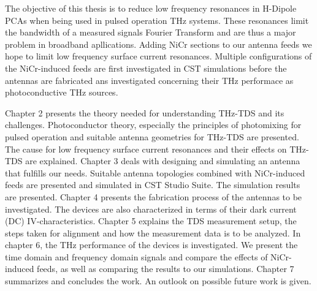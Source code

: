 The objective of this thesis is to reduce low frequency resonances in H-Dipole PCAs when being used in pulsed operation THz systems. These resonances limit the bandwidth of a measured signals Fourier Transform and are thus a major problem in broadband apllications. Adding NiCr sections to our antenna feeds we hope to limit low frequency surface current resonances. Multiple configurations of the NiCr-induced feeds are first investigated in CST simulations before the antennas are fabricated ans investigated concerning their THz performace as photoconductive THz sources.  

Chapter 2 presents the theory needed for understanding THz-TDS and its challenges. Photoconductor theory, especially the principles of photomixing for pulsed operation and suitable antenna geometries for THz-TDS are presented. The cause for low frequency surface current resonances and their effects on THz-TDS are explained. Chapter 3 deals with designing and simulating an antenna that fulfills our needs. Suitable antenna topologies combined with NiCr-induced feeds are presented and simulated in CST Studio Suite. The simulation results are presented. Chapter 4 presents the fabrication process of the antennas to be investigated. The devices are also characterized in terms of their dark current (DC) IV-characteristics. Chapter 5 explains the TDS measurement setup, the steps taken for alignment and how the measurement data is to be analyzed. In chapter 6, the THz performance of the devices is investigated. We present the time domain and frequency domain signals and compare the effects of NiCr-induced feeds, as well as comparing the results to our simulations. Chapter 7 summarizes and concludes the work. An outlook on possible future work is given.  